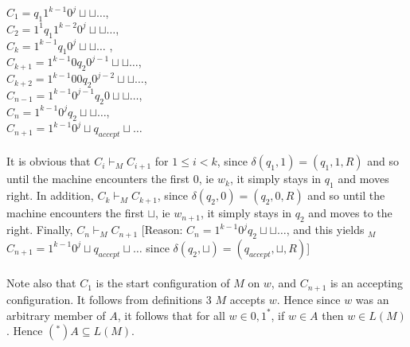 \documentclass[a4paper,12pt]{article}
\begin{document}
$C_1 = q_1 1^{k-1} 0^j \sqcup \sqcup \dots$, \\
$C_2 = 1^1 q_1 1^{k-2} 0^j \sqcup \sqcup \dots$, \\
$C_k = 1^{k-1} q_1 0^j \sqcup \sqcup \dots$ , \\
$C_{k+1} = 1^{k-1} 0 q_2 0^{j-1} \sqcup \sqcup \dots$, \\
$C_{k+2} = 1^{k-1} 0 0 q_2 0^{j-2} \sqcup \sqcup \dots$, \\
$C_{n-1} = 1^{k-1} 0^{j-1} q_2 0 \sqcup \sqcup \dots$, \\
$C_n = 1^{k-1} 0^j q_2 \sqcup \sqcup \dots$, \\
$C_{n+1} = 1^{k-1} 0^j \sqcup q_{accept} \sqcup \dots$ \\
\\
It is obvious that $C_i \vdash_M C_{i+1}$ for $1 \leq i < k$, since 
$\delta ( q_1 , 1 ) = ( q_1 , 1 , R )$ and so until the machine encounters the first $0$, ie $w_k$, it simply stays in $q_1$ and moves right. In  addition, $C_k \vdash_M C_{k+1}$, since 
$\delta ( q_2 , 0 ) = ( q_2 , 0 , R )$ and so until the machine encounters the first $\sqcup$, ie $w_{n+1}$, it simply stays in $q_2$ and moves to the right. Finally, $C_n \vdash_M C_{n+1}$ [Reason: $C_n = 1^{k-1} 0^j q_2 \sqcup \sqcup \dots$, and this yields $_M$ $C_{n+1} = 1^{k-1} 0^j \sqcup q_{accept} \sqcup \dots$ since $\delta ( q_2 , \sqcup ) = ( q_{accept} , \sqcup , R )$]  \\
\\
Note also that $C_1$ is the start configuration of $M$ on $w$, and $C_{n+1}$ is an accepting configuration. It follows from definitions 3 $M$ accepts $w$. Hence since $w$ was an arbitrary member of $A$, it follows that for all $w \in {0,1}^*$, if $w \in A$ then $w \in L(M)$. Hence $(^*) A \subseteq L(M)$. \\
\end{document}
